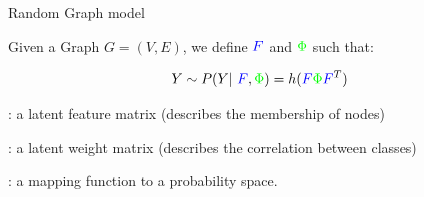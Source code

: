 \begin{frame}[t]{Random Graph model}

Given a Graph $G=(V,E)$,  we define $\textcolor{blue}{F}$ and $\textcolor{green}{\Phi}$ such that:

\begin{equation*}
    Y \sim P(Y | \textcolor{blue}{F}, \textcolor{green}{\Phi}) =h( \textcolor{blue}{F}\textcolor{green}{\Phi} \textcolor{blue}{F}^T )
\end{equation*}


\begin{description}
\setlength{\itemindent}{-2cm}
\item[\textcolor{blue}{$F$}]: a latent feature matrix (describes the membership of nodes)
\item[\textcolor{green}{$\Phi$}]: a latent weight matrix (describes the correlation between classes)
\item[$h$]: a mapping function to a probability space.
\end{description}

\pause


    \begin{columns}
        \begin{column}{0.6\textwidth}
            


\end{column}
\end{columns}
\end{frame}
